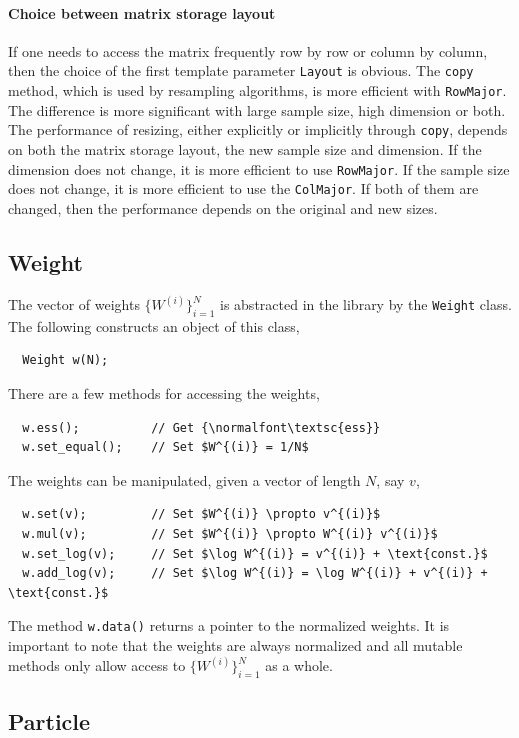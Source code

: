 \paragraph{Choice between matrix storage layout}

If one needs to access the matrix frequently row by row or column by column,
then the choice of the first template parameter \verb|Layout| is obvious. The
\verb|copy| method, which is used by resampling algorithms, is more efficient
with \verb|RowMajor|. The difference is more significant with large sample
size, high dimension or both. The performance of resizing, either explicitly or
implicitly through \verb|copy|, depends on both the matrix storage layout, the
new sample size and dimension. If the dimension does not change, it is more
efficient to use \verb|RowMajor|. If the sample size does not change, it is
more efficient to use the \verb|ColMajor|. If both of them are changed, then
the performance depends on the original and new sizes.

\subsection{Weight}
\label{sub:Weight}

The vector of weights $\{W^{(i)}\}_{i=1}^N$ is abstracted in the library by the
\verb|Weight| class. The following constructs an object of this class,
\begin{Verbatim}
  Weight w(N);
\end{Verbatim}
There are a few methods for accessing the weights,
\begin{Verbatim}
  w.ess();          // Get {\normalfont\textsc{ess}}
  w.set_equal();    // Set $W^{(i)} = 1/N$
\end{Verbatim}
The weights can be manipulated, given a vector of length $N$, say $v$,
\begin{Verbatim}
  w.set(v);         // Set $W^{(i)} \propto v^{(i)}$
  w.mul(v);         // Set $W^{(i)} \propto W^{(i)} v^{(i)}$
  w.set_log(v);     // Set $\log W^{(i)} = v^{(i)} + \text{const.}$
  w.add_log(v);     // Set $\log W^{(i)} = \log W^{(i)} + v^{(i)} + \text{const.}$
\end{Verbatim}
The method \verb|w.data()| returns a pointer to the normalized weights. It is
important to note that the weights are always normalized and all mutable
methods only allow access to $\{W^{(i)}\}_{i=1}^N$ as a whole.

\subsection{Particle}
\label{sub:Particle}

